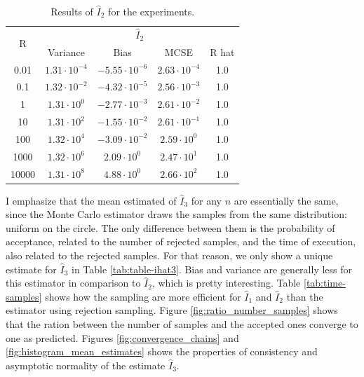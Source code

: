 \documentclass[a4paper,10pt, notitlepage]{report}
\begin{document}
\begin{table}[htb]
    \centering
    \begin{tabular}{ccccc}
    \hline
    \multirow{2}{*}{R} & \multicolumn{4}{c}{$\hat{I}_2$} \\ \cline{2-5} 
     & Variance & Bias & MCSE & R hat \\ \hline
    0.01 & $1.31\cdot 10^{-4}$ & $-5.55\cdot 10^{-6}$ & $2.63\cdot 10^{-4}$ & 1.0 \\
    0.1 & $1.32\cdot 10^{-2}$ & $-4.32\cdot 10^{-5}$ & $2.56\cdot 10^{-3}$ & 1.0 \\
    1 & $1.31\cdot 10^{0}$ & $-2.77 \cdot 10^{-3}$ & $2.61\cdot 10^{-2}$ &
    1.0 \\
    10 & $1.31\cdot 10^{2}$ & $-1.55 \cdot 10^{-2}$ & $2.61\cdot 10^{-1}$ & 1.0 \\
    100 & $1.32\cdot 10^{4}$ & $-3.09 \cdot 10^{-2}$ & $2.59\cdot 10^{0}$ & 1.0 \\
    1000 & $1.32\cdot 10^{6}$ & $2.09 \cdot 10^{0}$ & $2.47\cdot 10^{1}$ &
    1.0 \\
    10000 & $1.31\cdot 10^{8}$ & $4.88 \cdot 10^{0}$ & $2.66\cdot 10^{2}$ &
    1.0 \\ \hline
    \end{tabular}
    \caption{\label{tab:table-ihat2} Results of $\widehat{I}_2$ for the experiments.}
\end{table}

I emphasize that the mean estimated of $\hat{I}_3$ for any $n$ are essentially
the same, since the Monte Carlo estimator draws the samples from the same
distribution: uniform on the circle. The only difference between them is the
probability of acceptance, related to the number of rejected samples, and the
time of execution, also related to the rejected samples. For that reason, we
only show a unique estimate for $\hat{I}_3$ in Table \ref{tab:table-ihat3}.
Bias and variance are generally less for this estimator in comparison to
$\hat{I}_2$, which is pretty interesting. Table \ref{tab:time-samples} shows
how the sampling are more efficient for $\hat{I}_1$ and $\hat{I}_2$ than the
estimator using rejection sampling. Figure \ref{fig:ratio_number_samples}
shows that the ration between the number of samples and the accepted ones
converge to one as predicted. Figures \ref{fig:convergence_chains} and
\ref{fig:histogram_mean_estimates} shows the properties of consistency and
asymptotic normality of the estimate $\hat{I}_3$.
\end{document}
